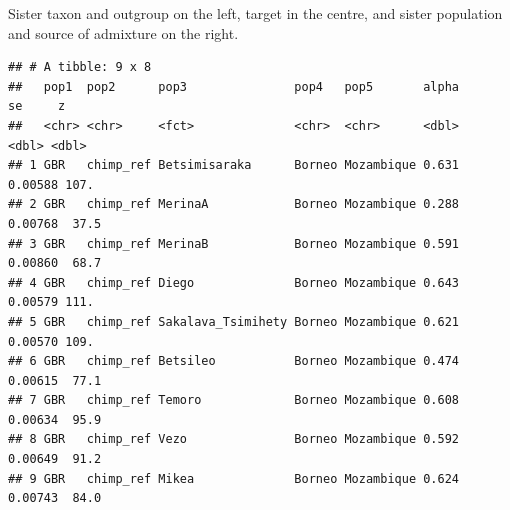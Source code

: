 \documentclass[
]{article}
\newenvironment{Shaded}{\begin{snugshade}}{\end{snugshade}}
\newcommand{\AttributeTok}[1]{\textcolor[rgb]{0.13,0.29,0.53}{#1}}
\newcommand{\CommentTok}[1]{\textcolor[rgb]{0.56,0.35,0.01}{\textit{#1}}}
\newcommand{\FunctionTok}[1]{\textcolor[rgb]{0.13,0.29,0.53}{\textbf{#1}}}
\newcommand{\NormalTok}[1]{#1}
\newcommand{\OtherTok}[1]{\textcolor[rgb]{0.56,0.35,0.01}{#1}}
\newcommand{\SpecialCharTok}[1]{\textcolor[rgb]{0.81,0.36,0.00}{\textbf{#1}}}
\newcommand{\StringTok}[1]{\textcolor[rgb]{0.31,0.60,0.02}{#1}}
\begin{document}
Sister taxon and outgroup on the left, target in the centre, and sister
population and source of admixture on the right.

\begin{Shaded}
\end{Shaded}

\begin{verbatim}
## # A tibble: 9 x 8
##   pop1  pop2      pop3               pop4   pop5       alpha      se     z
##   <chr> <chr>     <fct>              <chr>  <chr>      <dbl>   <dbl> <dbl>
## 1 GBR   chimp_ref Betsimisaraka      Borneo Mozambique 0.631 0.00588 107. 
## 2 GBR   chimp_ref MerinaA            Borneo Mozambique 0.288 0.00768  37.5
## 3 GBR   chimp_ref MerinaB            Borneo Mozambique 0.591 0.00860  68.7
## 4 GBR   chimp_ref Diego              Borneo Mozambique 0.643 0.00579 111. 
## 5 GBR   chimp_ref Sakalava_Tsimihety Borneo Mozambique 0.621 0.00570 109. 
## 6 GBR   chimp_ref Betsileo           Borneo Mozambique 0.474 0.00615  77.1
## 7 GBR   chimp_ref Temoro             Borneo Mozambique 0.608 0.00634  95.9
## 8 GBR   chimp_ref Vezo               Borneo Mozambique 0.592 0.00649  91.2
## 9 GBR   chimp_ref Mikea              Borneo Mozambique 0.624 0.00743  84.0
\end{verbatim}
\end{document}
